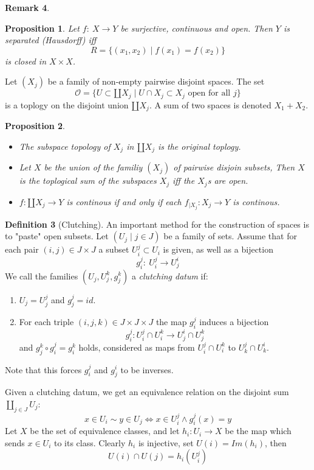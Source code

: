 \documentclass[11pt,a4paper]{article}
\theoremstyle{definition}
\newtheorem{definition}{Definition}[section]
\newtheorem{remark}[definition]{Remark}
\theoremstyle{plain}
\newtheorem{proposition}[definition]{Proposition}
\theoremstyle{remark}
\begin{document}
\begin{remark}
\begin{proposition}
  Let $f \colon \: X \to Y$ be surjective, continuous and open. Then $Y$ is separated (Hausdorff) iff 
  $$R = \{(x_1, x_2) \mid f(x_1) = f(x_2)\}$$
  is closed in $X \times X$. 
\end{proposition}

Let $(X_j)$ be a family of non-empty pairwise disjoint spaces. The set 
$$\mathcal{O} = \{U \subset \amalg X_j \mid U \cap X_j \subset X_j \text{ open for all } j\}$$
is a toplogy on the disjoint union $\amalg X_j$. A sum of two spaces is denoted $X_1 + X_2$. 

\begin{proposition}
  \begin{itemize}
    \item The subspace topology of $X_j$ in $\amalg X_j$ is the original toplogy. 
    \item Let $X$ be the union of the familiy $(X_j)$ of pairwise disjoin subsets, Then $X$ is the 
    toplogical sum of the subspaces $X_j$ iff the $X_j$s are open. 
    \item $f \colon \amalg X_j \to Y$ is continous if and only if each $f_{\mid X_j} \colon X_j \to Y$ is continous. 
  \end{itemize}
\end{proposition}

\begin{definition}[Clutching]
  An important method for the construction of spaces is to "paste" open subsets. 
  Let $(U_j \mid j \in J)$ be a family of sets. Assume that for each pair $(i, j) \in J \times J$ a subset $U^j_i \subset U_i$ is given, 
  as well as a bijection 
  $$g_i^j \colon \: U_i^j \to U_j^i$$
  We call the families $(U_j, U_j^k, g_j^k)$ a \emph{clutching datum} if: 
  \begin{enumerate}
    \item $U_j = U_j^j$ and $g_j^j = id$. 
    \item For each triple $(i,j,k) \in J \times J \times J$ the map $g_i^j$ induces a bijection 
    $$g_i^j \colon U_i^j \cap U_i^k \to U_j^i \cap U_j^k$$
    and $g_j^k \circ g_i^j = g_i^k$ holds, considered as maps from $U_i^j \cap U_i^k$ to $U_k^j \cap U_k^i$. \\
  \end{enumerate}  
  Note that this forces $g_i^j$ and $g_j^i$ to be inverses. 
\end{definition}

Given a clutching datum, we get an equivalence relation on the disjoint sum $\amalg_{j \in J} U_j$: 
$$x \in U_i \sim y \in U_j \iff x \in U_i^j \land g_i^j(x) = y$$
Let $X$ be the set of equivalence classes, and let $h_i \colon U_i \to X$ be the map which sends 
$x \in U_i$ to its class. Clearly $h_i$ is injective, set $U(i) = Im(h_i)$, then 
$$U(i) \cap U(j) = h_i(U_i^j)$$


\end{remark}
\end{document}

